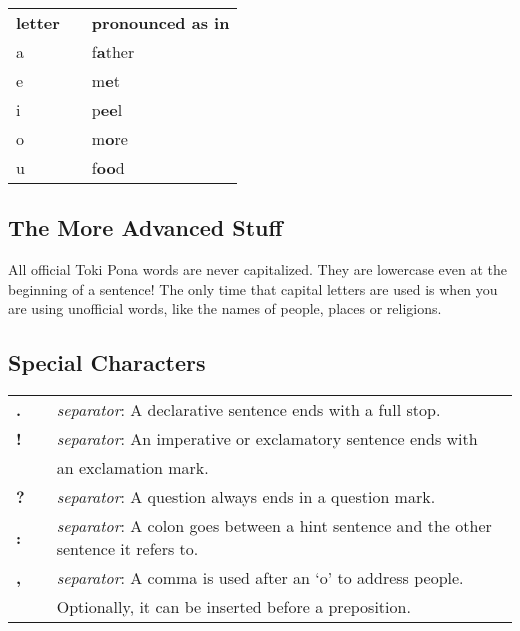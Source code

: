 \begin{supertabular}{p{2cm}|ll}
\textbf{letter}   &&    \textbf{pronounced as in} \\ %
a   &&    f\textbf{a}ther \\ %
e   &&    m\textbf{e}t    \\ %
i   &&    p\textbf{ee}l   \\ %
o   &&    m\textbf{o}re   \\ %
u   &&    f\textbf{oo}d   \\ %
\end{supertabular} 

%
\subsection*{The More Advanced Stuff}
%
All official Toki Pona words are never capitalized. 
They are lowercase even at the beginning of a sentence! 
The only time that capital letters are used is when you are using unofficial words, like the names of people, places or religions. 
%
%
\subsection*{Special Characters}
%

\begin{supertabular}{p{2cm}|ll} 
\textbf{.} && \textit{separator}: A declarative sentence ends with a full stop. \\ %
\textbf{!} && \textit{separator}: An imperative or exclamatory sentence ends with \\ &&  an exclamation mark. \\ %
\textbf{?} && \textit{separator}: A question always ends in a question mark. \\ %
\textbf{:} && \textit{separator}: A colon goes between a hint sentence and the other sentence it refers to. \\  %
\textbf{,} && \textit{separator}: A comma is used after an `o' to address people. \\ && Optionally, it can be inserted before a preposition. \\ %
\end{supertabular} \\

